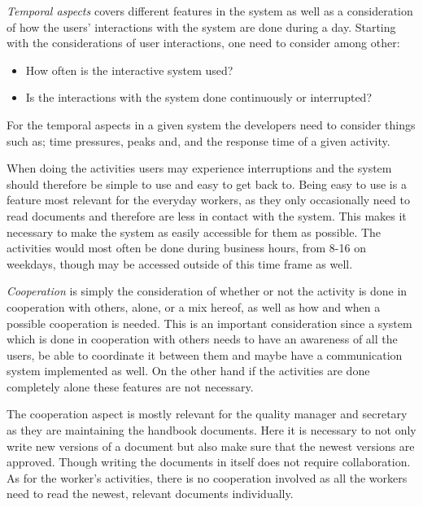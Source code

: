 \textit{Temporal aspects} covers different features in the system as well as a consideration of how the users' interactions with the system are done during a day.
Starting with the considerations of user interactions, one need to consider among other:

\begin{itemize}
	\item How often is the interactive system used?
	\item Is the interactions with the system done continuously or interrupted?
\end{itemize}

For the temporal aspects in a given system the developers need to consider things such as; time pressures, peaks and, and the response time of a given activity. %

When doing the activities users may experience interruptions and the system should therefore be simple to use and easy to get back to.
Being easy to use is a feature most relevant for the everyday workers, as they only occasionally need to read documents and therefore are less in contact with the system.
This makes it necessary to make the system as easily accessible for them as possible.
The activities would most often be done during business hours, from 8-16 on weekdays, though may be accessed outside of this time frame as well.


\textit{Cooperation} is simply the consideration of whether or not the activity is done in cooperation with others, alone, or a mix hereof, as well as how and when a possible cooperation is needed.
This is an important consideration since a system which is done in cooperation with others needs to have an awareness of all the users, be able to coordinate it between them and maybe have a communication system implemented as well.
On the other hand if the activities are done completely alone these features are not necessary.

The cooperation aspect is mostly relevant for the quality manager and secretary as they are maintaining the handbook documents.
Here it is necessary to not only write new versions of a document but also make sure that the newest versions are approved.
Though writing the documents in itself does not require collaboration.
As for the worker's activities, there is no cooperation involved as all the workers need to read the newest, relevant documents individually.

